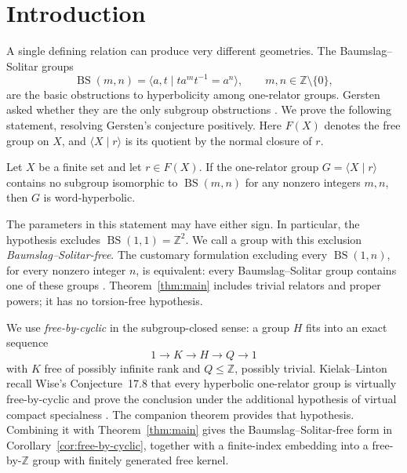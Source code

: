 \section{Introduction}

A single defining relation can produce very different geometries.
The Baumslag--Solitar groups
\[
 \operatorname{BS}(m,n)
   =\langle a,t\mid ta^mt^{-1}=a^n\rangle,
 \qquad m,n\in\mathbb Z\setminus\{0\},
\]
are the basic obstructions to hyperbolicity among one-relator groups.
Gersten asked whether they are the only subgroup obstructions
\cite[p.~228]{Gersten1992Problems}.
We prove the following statement, resolving Gersten's conjecture positively.
Here $F(X)$ denotes the free group on $X$, and
$\langle X\mid r\rangle$ is its quotient by the normal closure of $r$.

\begin{theorem}\label{thm:main}
Let $X$ be a finite set and let $r\in F(X)$. If the one-relator group
$G=\langle X\mid r\rangle$ contains no subgroup isomorphic to
$\operatorname{BS}(m,n)$ for any nonzero integers $m,n$, then $G$ is
word-hyperbolic.
\end{theorem}

The parameters in this statement may have either sign. In particular,
the hypothesis excludes $\operatorname{BS}(1,1)=\mathbb Z^2$.
We call a group with this exclusion \emph{Baumslag--Solitar-free}.
The customary formulation excluding every $\operatorname{BS}(1,n)$,
for every nonzero integer $n$, is equivalent: every Baumslag--Solitar group contains
one of these groups \cite[Lemma~2.10]{GardamKielakLogan2025Algebraically}.
Theorem~\ref{thm:main} includes trivial relators and proper powers; it
has no torsion-free hypothesis.

We use \emph{free-by-cyclic} in the subgroup-closed sense: a group $H$
fits into an exact sequence
\[
1\longrightarrow K\longrightarrow H\longrightarrow Q\longrightarrow1
\]
with $K$ free of possibly infinite rank and $Q\leq\mathbb Z$, possibly
trivial. Kielak--Linton recall Wise's Conjecture~17.8 that every
hyperbolic one-relator group is virtually free-by-cyclic and prove the
conclusion under the additional hypothesis of virtual compact
specialness \cite[Section~1.1 and Corollary~1.3]{KielakLinton2024Virtually}.
The companion theorem \cite[Theorem~1.1]{OpenAIVirtualSpecialness}
provides that hypothesis. Combining it with Theorem~\ref{thm:main}
gives the Baumslag--Solitar-free form in
Corollary~\ref{cor:free-by-cyclic}, together with a finite-index
embedding into a free-by-$\mathbb Z$ group with finitely generated
free kernel.

